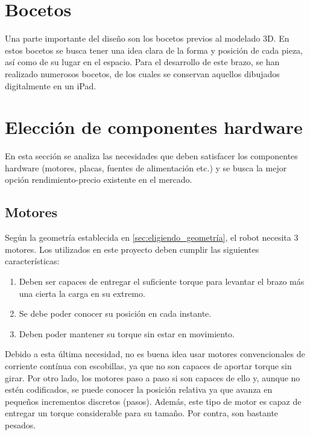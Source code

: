 \section{Bocetos}
Una parte importante del diseño son los bocetos previos al modelado 3D. En estos bocetos se busca tener una idea clara de la forma 
y posición de cada pieza, así como de su lugar en el espacio.  
Para el desarrollo de este brazo, se han realizado numerosos bocetos, de los cuales se conservan aquellos dibujados digitalmente en 
un iPad.
\section{Elección de componentes hardware}
En esta sección se analiza las necesidades que deben satisfacer los componentes hardware (motores, placas, fuentes de alimentación etc.)
y se busca la mejor opción rendimiento-precio existente en el mercado. 

\subsection{Motores}
Según la geometría establecida en \ref{sec:eligiendo_geometría}, el robot necesita 3 motores. Los utilizados en este proyecto deben
cumplir las siguientes características:
\begin{enumerate}
  \item Deben ser capaces de entregar el suficiente torque para levantar el brazo más una cierta la carga en su extremo.
  \item Se debe poder conocer su posición en cada instante.
  \item Deben poder mantener su torque sin estar en movimiento.
\end{enumerate}

Debido a esta última necesidad, no es buena idea usar motores convencionales de corriente contínua con escobillas, ya que no son 
capaces de aportar torque sin girar. Por otro lado, los motores paso a paso si son capaces de ello y, aunque no estén codificados,
se puede conocer la posición relativa ya que avanza en pequeños incrementos discretos (pasos). Además, este tipo de motor es capaz de 
entregar un torque considerable para su tamaño. Por contra, son bastante pesados. 

